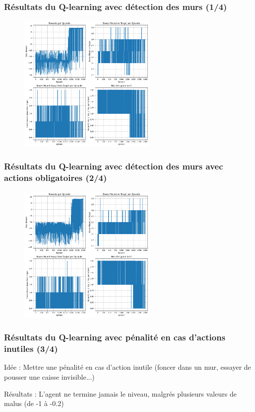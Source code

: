 \documentclass[
	11pt, %
]{beamer}
\begin{document}
\begin{frame}
    \frametitle{Résultats du Q-learning avec détection des murs (1/4)}
    \begin{figure}
        \centering
        \includegraphics[width=0.6\textwidth]{results/q_learning_dict_with_wall_detection/q_learning_dict_with_wall_detection.png}
    \end{figure}
\end{frame}
\begin{frame}
    \frametitle{Résultats du Q-learning avec détection des murs avec actions obligatoires (2/4)}
    \begin{figure}
        \centering
        \includegraphics[width=0.6\textwidth]{results/q_learning_dict_with_wall_detection_with_no_empty_actions/figures.png}
    \end{figure}
\end{frame}
\begin{frame}
    \frametitle{Résultats du Q-learning avec pénalité en cas d'actions inutiles (3/4)}
    \begin{block}{Idée :}
        \small Mettre une pénalité en cas d'action inutile (foncer dans un mur, essayer de pousser une caisse invisible...)
    \end{block}
    \begin{block}{Résultats :}
        \small L'agent ne termine jamais le niveau, malgrés plusieurs valeurs de malus (de -1 à -0.2)
    \end{block}
\end{frame}
\end{document}
